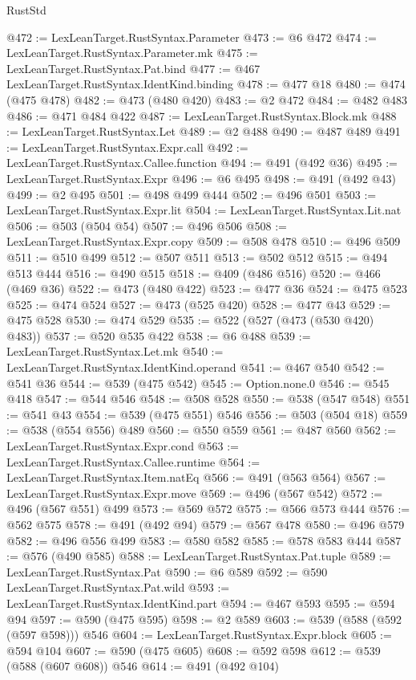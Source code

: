 \begin{lexlean}{RustStd}
\begin{coremodule}
@472 := LexLeanTarget.RustSyntax.Parameter
@473 := @6 @472
@474 := LexLeanTarget.RustSyntax.Parameter.mk
@475 := LexLeanTarget.RustSyntax.Pat.bind
@477 := @467 LexLeanTarget.RustSyntax.IdentKind.binding
@478 := @477 @18
@480 := @474 (@475 @478)
@482 := @473 (@480 @420)
@483 := @2 @472
@484 := @482 @483
@486 := @471 @484 @422
@487 := LexLeanTarget.RustSyntax.Block.mk
@488 := LexLeanTarget.RustSyntax.Let
@489 := @2 @488
@490 := @487 @489
@491 := LexLeanTarget.RustSyntax.Expr.call
@492 := LexLeanTarget.RustSyntax.Callee.function
@494 := @491 (@492 @36)
@495 := LexLeanTarget.RustSyntax.Expr
@496 := @6 @495
@498 := @491 (@492 @43)
@499 := @2 @495
@501 := @498 @499 @444
@502 := @496 @501
@503 := LexLeanTarget.RustSyntax.Expr.lit
@504 := LexLeanTarget.RustSyntax.Lit.nat
@506 := @503 (@504 @54)
@507 := @496 @506
@508 := LexLeanTarget.RustSyntax.Expr.copy
@509 := @508 @478
@510 := @496 @509
@511 := @510 @499
@512 := @507 @511
@513 := @502 @512
@515 := @494 @513 @444
@516 := @490 @515
@518 := @409 (@486 @516)
@520 := @466 (@469 @36)
@522 := @473 (@480 @422)
@523 := @477 @36
@524 := @475 @523
@525 := @474 @524
@527 := @473 (@525 @420)
@528 := @477 @43
@529 := @475 @528
@530 := @474 @529
@535 := @522 (@527 (@473 (@530 @420) @483))
@537 := @520 @535 @422
@538 := @6 @488
@539 := LexLeanTarget.RustSyntax.Let.mk
@540 := LexLeanTarget.RustSyntax.IdentKind.operand
@541 := @467 @540
@542 := @541 @36
@544 := @539 (@475 @542)
@545 := Option.none.{0}
@546 := @545 @418
@547 := @544 @546
@548 := @508 @528
@550 := @538 (@547 @548)
@551 := @541 @43
@554 := @539 (@475 @551) @546
@556 := @503 (@504 @18)
@559 := @538 (@554 @556) @489
@560 := @550 @559
@561 := @487 @560
@562 := LexLeanTarget.RustSyntax.Expr.cond
@563 := LexLeanTarget.RustSyntax.Callee.runtime
@564 := LexLeanTarget.RustSyntax.Item.natEq
@566 := @491 (@563 @564)
@567 := LexLeanTarget.RustSyntax.Expr.move
@569 := @496 (@567 @542)
@572 := @496 (@567 @551) @499
@573 := @569 @572
@575 := @566 @573 @444
@576 := @562 @575
@578 := @491 (@492 @94)
@579 := @567 @478
@580 := @496 @579
@582 := @496 @556 @499
@583 := @580 @582
@585 := @578 @583 @444
@587 := @576 (@490 @585)
@588 := LexLeanTarget.RustSyntax.Pat.tuple
@589 := LexLeanTarget.RustSyntax.Pat
@590 := @6 @589
@592 := @590 LexLeanTarget.RustSyntax.Pat.wild
@593 := LexLeanTarget.RustSyntax.IdentKind.part
@594 := @467 @593
@595 := @594 @94
@597 := @590 (@475 @595)
@598 := @2 @589
@603 := @539 (@588 (@592 (@597 @598))) @546
@604 := LexLeanTarget.RustSyntax.Expr.block
@605 := @594 @104
@607 := @590 (@475 @605)
@608 := @592 @598
@612 := @539 (@588 (@607 @608)) @546
@614 := @491 (@492 @104)

\end{coremodule}
\end{lexlean}
